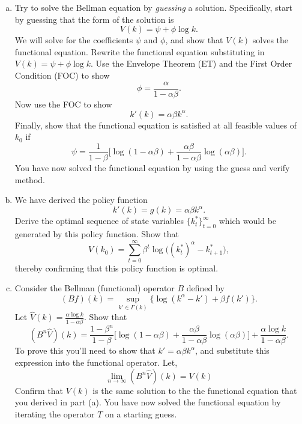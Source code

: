 \documentclass[11pt]{extarticle}
\theoremstyle{plain}
\theoremstyle{definition}
\begin{document}
\begin{enumerate}[(a)]
\item Try to solve the Bellman equation by \textit{guessing} a solution. Specifically, start by guessing that the form of the solution is 
\begin{equation*}
	V(k) = \psi + \phi \log k.
\end{equation*}
We will solve for the coefficients $\psi$ and $\phi$, and show that $V(k)$ solves the functional equation. Rewrite the functional equation substituting in $V(k) = \psi + \phi \log k$. Use the Envelope Theorem (ET) and the First Order Condition (FOC) to show 
\begin{equation*}
	\phi = \frac{\alpha}{1 - \alpha \beta}.
\end{equation*}
Now use the FOC to show 
\begin{equation*}
	k'(k) = \alpha \beta k^\alpha.
\end{equation*}
Finally, show that the functional equation is satisfied at all feasible values of $k_0$ if 
\begin{equation*}
	\psi =\frac{1}{1-\beta }\bigg[ \log (1-\alpha \beta)+\frac{\alpha \beta}{1-\alpha \beta}\log (\alpha \beta )\bigg] .
\end{equation*}
You have now solved the functional equation by using the guess and verify method.


\item We have derived the policy function
\begin{equation*}
	k'(k) = g(k) = \alpha \beta k^\alpha.
\end{equation*}
Derive the optimal sequence of state variables $\{k_t^*\}_{t=0}^\infty$ which would be generated by this policy function. Show that 
\begin{equation*}
	V(k_0) = \sum_{t=0}^\infty \beta^t \log \bigg( (k_t^*)^\alpha - k_{t+1}^* \bigg),
\end{equation*}
thereby confirming that this policy function is optimal.


\item Consider the Bellman (functional) operator $B$ defined by
\begin{equation*}
	(B f)(k) = \sup_{k' \in \Gamma(k)} \Big\{ \log (k^\alpha - k') + \beta f(k') \Big\}.
\end{equation*}
Let $\hat V(k) = \frac{\alpha \log k}{1 - \alpha \beta}$. Show that
\begin{equation*}
	(B^n \hat V)(k) = \frac{1-\beta^n}{1-\beta} \bigg[\log (1-\alpha \beta) + \frac{\alpha \beta}{1 - \alpha \beta} \log (\alpha \beta) \bigg] + \frac{\alpha \log k}{1 - \alpha \beta}.
\end{equation*}
To prove this you'll need to show that $k' = \alpha \beta k^\alpha$, and substitute this expression into the functional operator. Let,
\begin{equation*}
	\lim_{n \rightarrow \infty} (B^n \hat V)(k) = V(k)
\end{equation*}
Confirm that $V(k)$ is the same solution to the the functional equation that you derived in part (a). You have now solved the functional equation by iterating the operator $T$ on a starting guess.

\end{enumerate}
\end{document}
